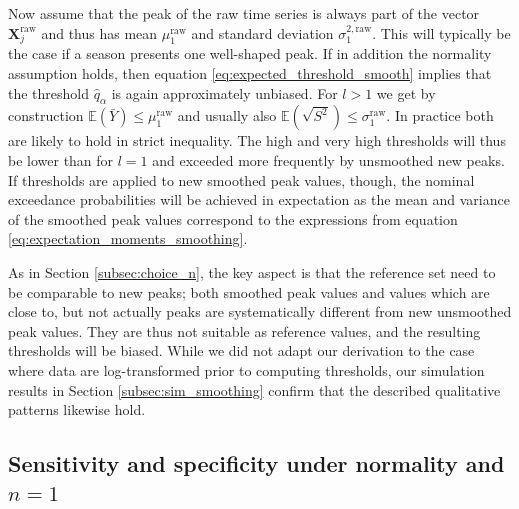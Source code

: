 \documentclass{article}
\begin{document}
Now assume that the peak of the raw time series is always part of the vector $\mathbf{X}_j^\text{raw}$ and thus has mean $\mu^\text{raw}_1$ and standard deviation $\sigma^{2, \text{raw}}_1$. This will typically be the case if a season presents one well-shaped peak. If in addition the normality assumption holds, then equation \eqref{eq:expected_threshold_smooth} implies that the threshold $\hat{q}_\alpha$ is again approximately unbiased. %
For $l > 1$ we get by construction $\mathbb{E}(\bar{Y}) \leq \mu^\text{raw}_1$ and usually also $\mathbb{E}(\sqrt{S^2}) \leq \sigma^\text{raw}_1$. In practice both are likely to hold in strict inequality. The high and very high thresholds will thus be lower than for $l = 1$ and exceeded more frequently by unsmoothed new peaks. If thresholds are applied to new smoothed peak values, though, the nominal exceedance probabilities will be achieved in expectation as the mean and variance of the smoothed peak values correspond to the expressions from equation \eqref{eq:expectation_moments_smoothing}.

As in Section \ref{subsec:choice_n}, the key aspect is that the reference set need to be comparable to new peaks; both smoothed peak values and values which are close to, but not actually peaks are systematically different from new unsmoothed peak values. They are thus not suitable as reference values, and the resulting thresholds will be biased. While we did not adapt our derivation to the case where data are log-transformed prior to computing thresholds, our simulation results in Section \ref{subsec:sim_smoothing} confirm that the described qualitative patterns likewise hold.



\subsection{Sensitivity and specificity under normality and $n = 1$}
\label{subsec:theory_sensitivity}
\end{document}
